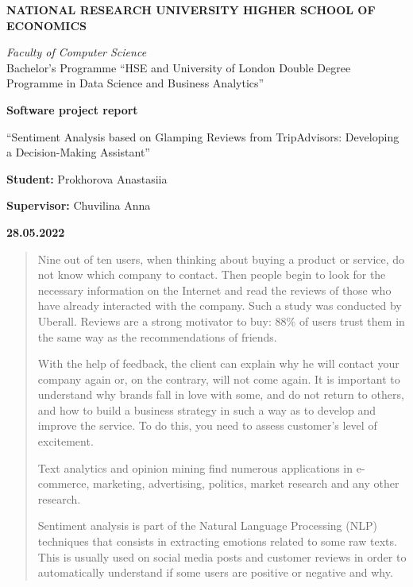 \documentclass{article}
\begin{document}
\begin{center}
\textbf{NATIONAL RESEARCH UNIVERSITY HIGHER SCHOOL OF ECONOMICS}

\vspace{20mm}
\textit{Faculty of Computer Science}\\

Bachelor’s Programme “HSE and University of London Double Degree Programme in Data Science and Business Analytics”

\vspace{50mm}
\textbf{Software project report}

“Sentiment Analysis based on Glamping Reviews from TripAdvisors: Developing a Decision-Making Assistant”

\vspace{50mm}
\textbf{Student:} Prokhorova Anastasiia

\vspace{5mm}
\textbf{Supervisor:} Chuvilina Anna

\vspace{20mm}
\end{center}
\begin{center}
    \textbf{28.05.2022}
\end{center}

\renewcommand*\contentsname{Table of contents}
\newpage
\tableofcontents
\newpage

\begin{abstract}
Nine out of ten users, when thinking about buying a product or service, do not know which company to contact. Then people begin to look for the necessary information on the Internet and read the reviews of those who have already interacted with the company. Such a study was conducted by Uberall. Reviews are a strong motivator to buy: 88\% of users trust them in the same way as the recommendations of friends.

With the help of feedback, the client can explain why he will contact your company again or, on the contrary, will not come again. It is important to understand why brands fall in love with some, and do not return to others, and how to build a business strategy in such a way as to develop and improve the service. To do this, you need to assess customer’s level of excitement.

Text analytics and opinion mining find numerous applications in e-commerce, marketing, advertising, politics, market research and any other research.

Sentiment analysis is part of the Natural Language Processing (NLP) techniques that consists in extracting emotions related to some raw texts. This is usually used on social media posts and customer reviews in order to automatically understand if some users are positive or negative and why.
\end{abstract}
\end{document}
